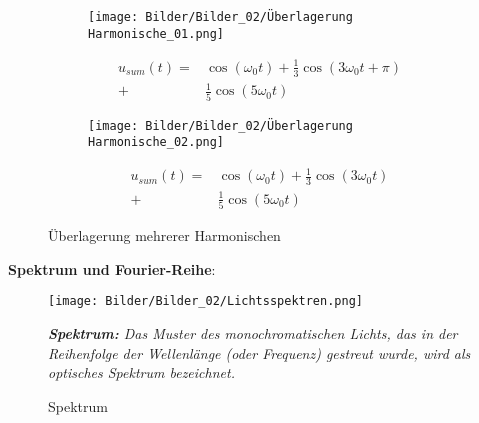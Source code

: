 \begin{figure}[H]
    \centering
    \begin{minipage}{.45\textwidth}
        \begin{figure}[H]
            \centering
            \texttt{[image: Bilder/Bilder\_02/Überlagerung Harmonische\_01.png]}
            \nonumber
        \end{figure}
        \begin{equation}
        \begin{split}
               u_{s u m}(t)=&\cos \left(\omega_{0} t\right)+\frac{1}{3} \cos \left(3 \omega_{0} t+\pi\right) \\+&\frac{1}{5} \cos \left(5 \omega_{0} t\right)
        \end{split}
             \nonumber
        \end{equation}
    \end{minipage}
    \begin{minipage}{.45\textwidth}
        \centering
        \begin{figure}[H]
            \centering
            \texttt{[image: Bilder/Bilder\_02/Überlagerung Harmonische\_02.png]}
            \nonumber
        \end{figure}
        \begin{equation}
        \begin{split}
            u_{s u m}(t)=&\cos \left(\omega_{0} t\right)+\frac{1}{3} \cos \left(3 \omega_{0} t\right) \\ +&\frac{1}{5} \cos \left(5 \omega_{0} t\right)
        \end{split}
        \nonumber
        \end{equation}
    \end{minipage}
        \caption{Überlagerung mehrerer Harmonischen}
\end{figure}

\textbf{Spektrum und Fourier-Reihe}:\\
\begin{figure}[H]
    \centering
    \begin{minipage}{.5\textwidth}
        \centering
        \texttt{[image: Bilder/Bilder\_02/Lichtsspektren.png]}
        \nonumber
    \end{minipage}
    \hspace{0.6cm}
    \begin{minipage}{.4\textwidth}
        \textit{\textbf{Spektrum:} Das Muster des monochromatischen Lichts, das in der Reihenfolge der Wellenlänge (oder Frequenz) gestreut wurde, wird als optisches Spektrum bezeichnet.}
    \end{minipage}
    \caption{Spektrum}
    \label{fig:Spektrum}
\end{figure}

